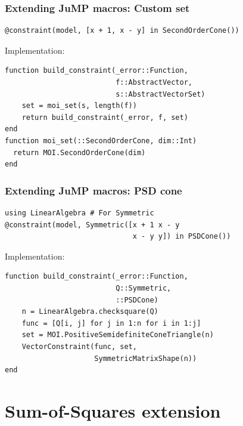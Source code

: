 \documentclass{beamer}
\begin{document}
\begin{frame}[fragile]
  \frametitle{Extending JuMP macros: Custom set}
\begin{verbatim}
@constraint(model, [x + 1, x - y] in SecondOrderCone())
\end{verbatim}
  Implementation:
\begin{verbatim}
function build_constraint(_error::Function,
                          f::AbstractVector,
                          s::AbstractVectorSet)
    set = moi_set(s, length(f))
    return build_constraint(_error, f, set)
end
function moi_set(::SecondOrderCone, dim::Int)
  return MOI.SecondOrderCone(dim)
end
\end{verbatim}
\end{frame}

\begin{frame}[fragile]
  \frametitle{Extending JuMP macros: PSD cone}
\begin{verbatim}
using LinearAlgebra # For Symmetric
@constraint(model, Symmetric([x + 1 x - y
                              x - y y]) in PSDCone())
\end{verbatim}
  Implementation:
\begin{verbatim}
function build_constraint(_error::Function,
                          Q::Symmetric,
                          ::PSDCone)
    n = LinearAlgebra.checksquare(Q)
    func = [Q[i, j] for j in 1:n for i in 1:j]
    set = MOI.PositiveSemidefiniteConeTriangle(n)
    VectorConstraint(func, set,
                     SymmetricMatrixShape(n))
end
\end{verbatim}
\end{frame}

\section{Sum-of-Squares extension}
\end{document}
